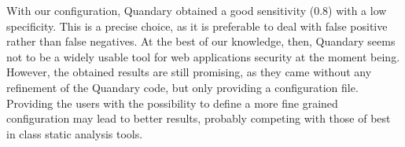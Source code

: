 \documentclass[../Report.tex]{subfiles}
\begin{document}
With our configuration, Quandary obtained a good sensitivity ($0.8$) with a low specificity. This is a precise choice, as it is preferable to deal with false positive rather than false negatives. At the best of our knowledge, then, Quandary seems not to be a widely usable tool for web applications security at the moment being. \\
However, the obtained results are still promising, as they came without any refinement of the Quandary code, but only providing a configuration file. Providing the users with the possibility to define a more fine grained configuration may lead to better results, probably competing with those of best in class static analysis tools.
\end{document}
